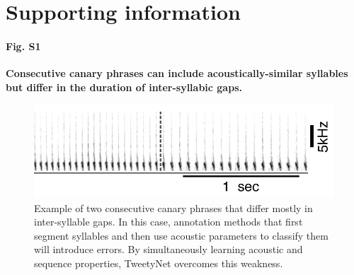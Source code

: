 \documentclass[10pt,letterpaper]{article}
\newcommand{\beginsupplement}{%
        \setcounter{table}{0}
        \renewcommand{\thetable}{S\arabic{table}}%
        \setcounter{figure}{0}
        \renewcommand{\thefigure}{S\arabic{figure}}%
     }
\begin{document}
\section*{Supporting information}
\beginsupplement
\paragraph*{Fig. S1}
\label{S1_Fig}
{\bf Consecutive canary phrases can include acoustically-similar syllables but differ in the duration of inter-syllabic gaps.}
\begin{figure}[!ht]
\includegraphics[scale=1.0]{Figures/Supplementaries/Supp_Figure1_1.png}
\caption{Example of two consecutive canary phrases that differ mostly in inter-syllable gaps. In this case, annotation methods that first segment syllables and then use acoustic parameters to classify them will introduce errors. By simultaneously learning acoustic and sequence properties, TweetyNet overcomes this weakness.}
\label{supp_fig_1}
\end{figure}
\end{document}
